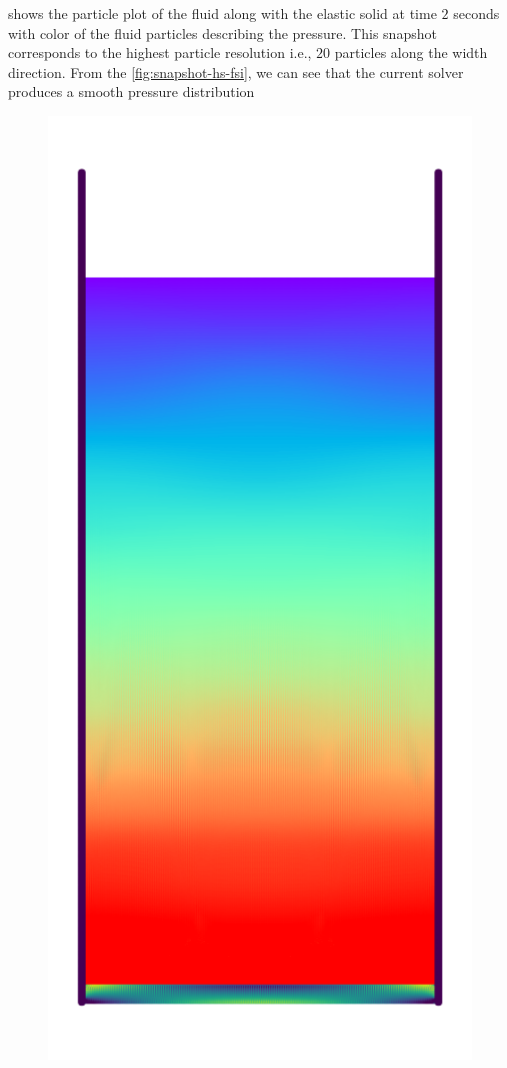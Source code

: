 \documentclass[10pt, conference]{FMFP2022}
\begin{document}
 shows the particle plot of the fluid along with the
elastic solid at time $2$ seconds with color of the fluid particles describing
the pressure. This snapshot corresponds to the highest particle resolution i.e.,
$20$ particles along the width direction. From the \cref{fig:snapshot-hs-fsi},
we can see that the current solver produces a smooth pressure distribution
\begin{figure}
    \centering
    \subfigure
    {
      \includegraphics[scale=1.0]{figures/ng_2020_hydrostatic_water_column_on_elastic_plate/snap_t_0}
}
\end{figure}
\end{document}
